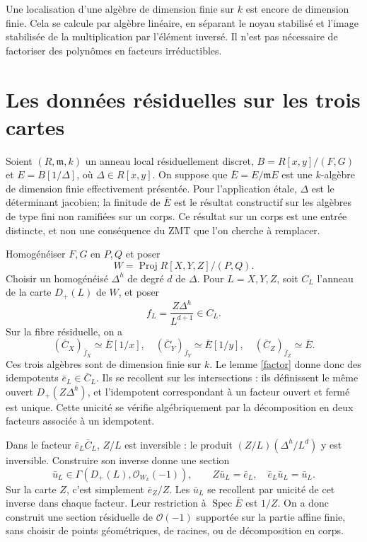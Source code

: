 \documentclass[11pt]{amsart}
\newcommand{\OO}{\mathcal O}
\newcommand{\m}{\mathfrak m}
\begin{document}
Une localisation d'une algèbre de dimension finie sur $k$ est encore
de dimension finie. Cela se calcule par algèbre linéaire, en séparant
le noyau stabilisé et l'image stabilisée de la multiplication par
l'élément inversé. Il n'est pas nécessaire de factoriser des polynômes
en facteurs irréductibles.

\section{Les données résiduelles sur les trois cartes}

Soient $(R,\m,k)$ un anneau local résiduellement discret,
$B=R[x,y]/(F,G)$ et $E=B[1/\Delta]$, où $\Delta\in R[x,y]$.
On suppose que $\bar E=E/\m E$ est une $k$-algèbre de dimension finie
effectivement présentée. Pour l'application étale, $\Delta$ est le
déterminant jacobien; la finitude de $\bar E$ est le résultat
constructif sur les algèbres de type fini non ramifiées sur un corps.
Ce résultat sur un corps est une entrée distincte, et non une
conséquence du ZMT que l'on cherche à remplacer.

Homogénéiser $F,G$ en $P,Q$ et poser
\[
 W=\operatorname{Proj}R[X,Y,Z]/(P,Q).
\]
Choisir un homogénéisé $\Delta^h$ de degré $d$ de $\Delta$.
Pour $L=X,Y,Z$, soit $C_L$ l'anneau de la carte $D_+(L)$ de $W$,
et poser
\[
 f_L=\frac{Z\Delta^h}{L^{d+1}}\in C_L.
\]
Sur la fibre résiduelle, on a
\[
 (\bar C_X)_{\bar f_X}\simeq\bar E[1/x],\quad
 (\bar C_Y)_{\bar f_Y}\simeq\bar E[1/y],\quad
 (\bar C_Z)_{\bar f_Z}\simeq\bar E.
\]
Ces trois algèbres sont de dimension finie sur $k$. Le lemme
\ref{factor} donne donc des idempotents $\bar e_L\in\bar C_L$.
Ils se recollent sur les intersections : ils définissent le même
ouvert $D_+(Z\Delta^h)$, et l'idempotent correspondant à un facteur
ouvert et fermé est unique. Cette unicité se vérifie algébriquement
par la décomposition en deux facteurs associée à un idempotent.

Dans le facteur $\bar e_L\bar C_L$, $Z/L$ est inversible : le
produit $(Z/L)(\Delta^h/L^d)$ y est inversible.
Construire son inverse donne une section
\[
 \bar u_L\in\Gamma(D_+(L),\OO_{W_k}(-1)),\qquad
 Z\bar u_L=\bar e_L,\quad \bar e_L\bar u_L=\bar u_L.
\]
Sur la carte $Z$, c'est simplement $\bar e_Z/Z$.
Les $\bar u_L$ se recollent par unicité de cet inverse dans chaque
facteur. Leur restriction à $\operatorname{Spec}\bar E$ est $1/Z$.
On a donc construit une section résiduelle de $\OO(-1)$ supportée
sur la partie affine finie, sans choisir de points géométriques,
de racines, ou de décomposition en corps.
\end{document}
